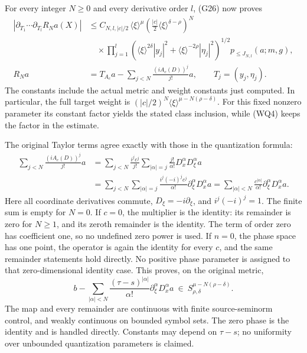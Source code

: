 \documentclass[
  11pt,
]{article}
\begin{document}
For every integer \(N\geq0\) and every derivative order \(l\), (G26) now
proves \[
 \begin{split}
 |\partial_{T_1}\cdots\partial_{T_l}R_Na(X)|
 &\leq C_{N,l,|c|/2}\,
       \langle\xi\rangle^\mu
       \left(\frac{|c|}{2}
                  \langle\xi\rangle^{\delta-\rho}\right)^N\\
 &\quad{}\times
       \prod_{j=1}^l
       \left(\langle\xi\rangle^{2\delta}|y_j|^2+
             \langle\xi\rangle^{-2\rho}|\eta_j|^2\right)^{1/2}
       p_{\leq J_{N,l}}(a;m,g),\\
 R_Na&=T_{A_c}a-\sum_{j<N}\frac{(iA_c(D))^j}{j!}a,
 \qquad T_j=(y_j,\eta_j).
 \end{split}
 \tag{WQ4}
\] The constants include the actual metric and weight constants just
computed. In particular, the full target weight is
\((|c|/2)^N\langle\xi\rangle^{\mu-N(\rho-\delta)}\). For this fixed
nonzero parameter its constant factor yields the stated class inclusion,
while (WQ4) keeps the factor in the estimate.

The original Taylor terms agree exactly with those in the quantization
formula: \[
 \begin{split}
 \sum_{j<N}\frac{(iA_c(D))^j}{j!}a
 &=\sum_{j<N}\frac{i^jc^j}{j!}
       \sum_{|\alpha|=j}\frac{j!}{\alpha!}
                     D_x^\alpha D_\xi^\alpha a\\
 &=\sum_{j<N}\sum_{|\alpha|=j}
       \frac{i^j(-i)^jc^j}{\alpha!}
                     \partial_\xi^\alpha D_x^\alpha a
 =\sum_{|\alpha|<N}\frac{c^{|\alpha|}}{\alpha!}
                     \partial_\xi^\alpha D_x^\alpha a.
 \end{split}
 \tag{WQ5}
\] Here all coordinate derivatives commute, \(D_\xi=-i\partial_\xi\),
and \(i^j(-i)^j=1\). The finite sum is empty for \(N=0\). If \(c=0\),
the multiplier is the identity: its remainder is zero for \(N\geq1\),
and its zeroth remainder is the identity. The term of order zero has
coefficient one, so no undefined zero power is used. If \(n=0\), the
phase space has one point, the operator is again the identity for every
\(c\), and the same remainder statements hold directly. No positive
phase parameter is assigned to that zero-dimensional identity case. This
proves, on the original metric, \[
b-\sum_{|\alpha|<N}
\frac{(\tau-s)^{|\alpha|}}{\alpha!}
\partial_\xi^\alpha D_x^\alpha a
\ \in\ S^{\mu-N(\rho-\delta)}_{\rho,\delta}.
\tag{W41}
\] The map and every remainder are continuous with finite
source-seminorm control, and weakly continuous on bounded symbol sets.
The zero phase is the identity and is handled directly. Constants may
depend on \(\tau-s\); no uniformity over unbounded quantization
parameters is claimed.
\end{document}
